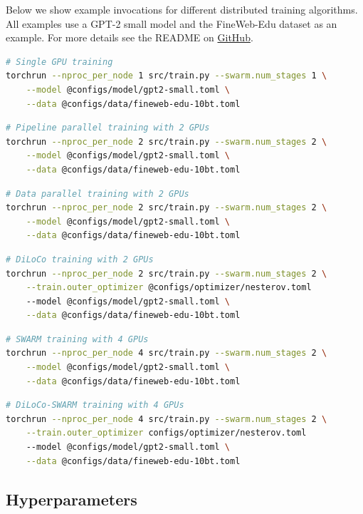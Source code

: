 \documentclass{article}
\newcommand{\github}{\href{https://github.com/mikasenghaas/swarm}{GitHub}}
\begin{document}
Below we show example invocations for different distributed training algorithms.
All examples use a GPT-2 small model and the FineWeb-Edu dataset as an example.
For more details see the README on \github.

\begin{lstlisting}[language=bash]
# Single GPU training
torchrun --nproc_per_node 1 src/train.py --swarm.num_stages 1 \
    --model @configs/model/gpt2-small.toml \
    --data @configs/data/fineweb-edu-10bt.toml
\end{lstlisting}

\begin{lstlisting}[language=bash]
# Pipeline parallel training with 2 GPUs
torchrun --nproc_per_node 2 src/train.py --swarm.num_stages 2 \
    --model @configs/model/gpt2-small.toml \
    --data @configs/data/fineweb-edu-10bt.toml
\end{lstlisting}

\begin{lstlisting}[language=bash]
# Data parallel training with 2 GPUs
torchrun --nproc_per_node 2 src/train.py --swarm.num_stages 2 \
    --model @configs/model/gpt2-small.toml \
    --data @configs/data/fineweb-edu-10bt.toml
\end{lstlisting}

\begin{lstlisting}[language=bash]
# DiLoCo training with 2 GPUs
torchrun --nproc_per_node 2 src/train.py --swarm.num_stages 2 \
    --train.outer_optimizer @configs/optimizer/nesterov.toml
    --model @configs/model/gpt2-small.toml \
    --data @configs/data/fineweb-edu-10bt.toml
\end{lstlisting}

\begin{lstlisting}[language=bash]
# SWARM training with 4 GPUs
torchrun --nproc_per_node 4 src/train.py --swarm.num_stages 2 \
    --model @configs/model/gpt2-small.toml \
    --data @configs/data/fineweb-edu-10bt.toml
\end{lstlisting}

\begin{lstlisting}[language=bash]
# DiLoCo-SWARM training with 4 GPUs
torchrun --nproc_per_node 4 src/train.py --swarm.num_stages 2 \
    --train.outer_optimizer configs/optimizer/nesterov.toml
    --model @configs/model/gpt2-small.toml \
    --data @configs/data/fineweb-edu-10bt.toml
\end{lstlisting}

\subsection{Hyperparameters}
\end{document}
